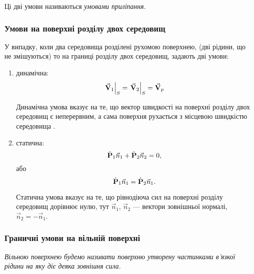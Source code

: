 \begin{definition}
	Ці дві умови називаються \it{умовами приліпання}.
\end{definition}

\subsubsection{Умови на поверхні розділу двох середовищ}

У випадку, коли два середовища розділені рухомою поверхнею, (дві рідини, що не змішуються) то на границі розділу двох середовищ, задають дві умови:
\begin{enumerate}
 	\item динамічна:
 	\begin{equation}
 		\left. \vecf V_1 \right|_S = \left. \vecf V_2 \right|_S = \vecf V_p
 	\end{equation}

	\begin{remark}
		Динамічна умова вказує на те, що вектор швидкості на поверхні розділу двох середовищ є неперервним, а сама поверхня рухається з місцевою швидкістю середовища  . 
	\end{remark}

 	\item статична:
 	\begin{equation}
 		\dot{\bf{P}}_1 \vec n_1 + \dot{\bf{P}}_2 \vec n_2 = 0,
 	\end{equation}
 	або
 	\begin{equation}
 		\dot{\bf{P}}_1 \vec n_1 = \dot{\bf{P}}_2 \vec n_1.
 	\end{equation}

	\begin{remark}
		Статична умова вказує на те, що рівнодіюча сил на поверхні розділу середовищ дорівнює нулю, тут $\vec n_1$, $\vec n_2$ --- вектори зовнішньої нормалі, $\vec n_2 = - \vec n_1$.
	\end{remark}
\end{enumerate}

\subsubsection{Граничні умови на вільній поверхні}

\begin{definition}
	\it{Вільною поверхнею} будемо називати поверхню утворену частинками в'язкої рідини на яку діє деяка зовнішня сила.
\end{definition}

